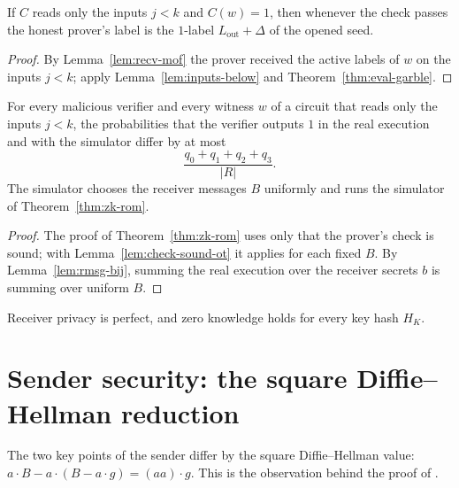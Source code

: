 \begin{lemma}
  \label{lem:check-sound-ot}
  \leanok
  If $C$ reads only the inputs $j < k$ and $C(w) = 1$, then whenever the check passes the honest
  prover's label is the $1$-label $L_{\mathrm{out}} + \Delta$ of the opened seed.
\end{lemma}

\begin{proof}
  \leanok
  By Lemma~\ref{lem:recv-mof} the prover received the active labels of $w$ on the inputs $j < k$;
  apply Lemma~\ref{lem:inputs-below} and Theorem~\ref{thm:eval-garble}.
\end{proof}

\begin{theorem}
  \label{thm:zk-ot}
  \leanok
  For every malicious verifier and every witness $w$ of a circuit that reads only the inputs
  $j < k$, the probabilities that the verifier outputs $1$ in the real execution and with the
  simulator differ by at most
  \[ \frac{q_0 + q_1 + q_2 + q_3}{|R|} . \]
  The simulator chooses the receiver messages $B$ uniformly and runs the simulator of
  Theorem~\ref{thm:zk-rom}.
\end{theorem}

\begin{proof}
  \leanok
  The proof of Theorem~\ref{thm:zk-rom} uses only that the prover's check is sound; with
  Lemma~\ref{lem:check-sound-ot} it applies for each fixed $B$. By Lemma~\ref{lem:rmsg-bij}, summing
  the real execution over the receiver secrets $b$ is summing over uniform $B$.
\end{proof}

\begin{remark}
  Receiver privacy is perfect, and zero knowledge holds for every key hash $H_K$.
\end{remark}

\section{Sender security: the square Diffie--Hellman reduction}

\begin{lemma}
  \label{lem:keys-sub}
  \leanok
  The two key points of the sender differ by the square Diffie--Hellman value:
  $a \cdot B - a \cdot (B - a \cdot g) = (a a) \cdot g$. This is the observation behind the proof of
  \cite[Lemma~2]{CO15}.
\end{lemma}

